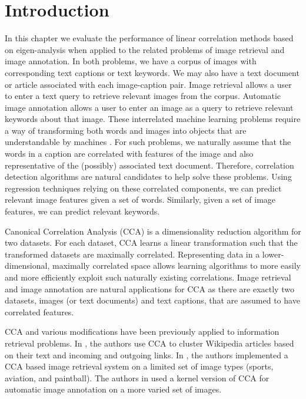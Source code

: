 
\section{Introduction}

In this chapter we evaluate the performance of linear correlation methods based on
eigen-analysis when applied to the related problems of image retrieval and image
annotation. In both problems, we have a corpus of images with corresponding text captions
or text keywords. We may also have a text document or article associated with each
image-caption pair.  Image retrieval allows a user to enter a text query to retrieve
relevant images from the corpus. Automatic image annotation allows a user to enter an
image as a query to retrieve relevant keywords about that image. These interrelated
machine learning problems require a way of transforming both words and images into objects
that are understandable by machines \cite{smeulders2000content}. For such problems, we
naturally assume that the words in a caption are correlated with features of the image and
also representative of the (possibly) associated text document. Therefore, correlation
detection algorithms are natural candidates to help solve these problems. Using regression
techniques relying on these correlated components, we can predict relevant image features given a
set of words. Similarly, given a set of image features, we can predict relevant keywords.

Canonical Correlation Analysis (CCA) is a dimensionality reduction algorithm for two
datasets. For each dataset, CCA learns a linear transformation such that the transformed
datasets are maximally correlated. Representing data in a lower-dimensional, maximally
correlated space allows learning algorithms to more easily and more efficiently exploit
such naturally existing correlations. Image retrieval and image annotation are natural
applications for CCA as there are exactly two datasets, images (or text documents) and
text captions, that are assumed to have correlated features.

CCA and various modifications have been previously applied to information retrieval
problems. In \cite{chaudhuri2009multi}, the authors use CCA to cluster Wikipedia articles
based on their text and incoming and outgoing links. In \cite{hardoon2004canonical}, the
authors implemented a CCA based image retrieval system on a limited set of image types
(sports, aviation, and paintball). The authors in \cite{hardoon2006correlation} used a
kernel version of CCA for automatic image annotation on a more varied set of images. 

